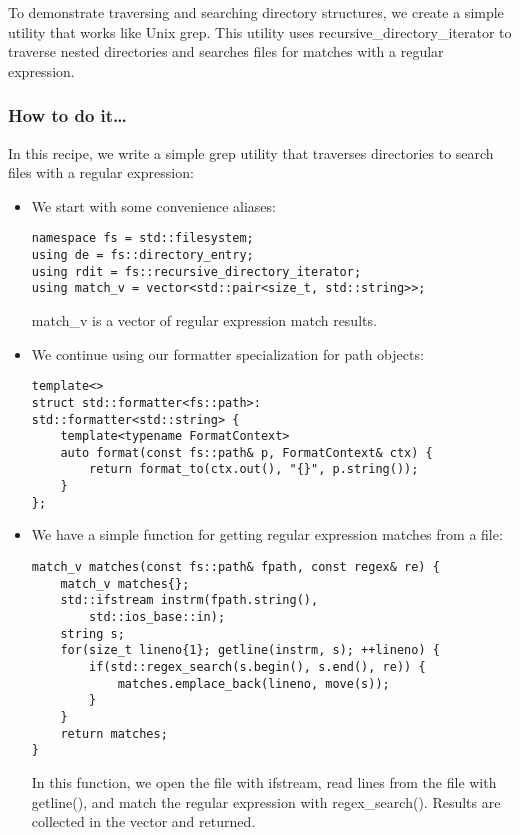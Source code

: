
To demonstrate traversing and searching directory structures, we create a simple utility that works like Unix grep. This utility uses recursive\_directory\_iterator to traverse nested directories and searches files for matches with a regular expression.

\subsubsection{How to do it…}

In this recipe, we write a simple grep utility that traverses directories to search files with a regular expression:

\begin{itemize}
\item 
We start with some convenience aliases:

\begin{lstlisting}[style=styleCXX]
namespace fs = std::filesystem;
using de = fs::directory_entry;
using rdit = fs::recursive_directory_iterator;
using match_v = vector<std::pair<size_t, std::string>>;
\end{lstlisting}

match\_v is a vector of regular expression match results.

\item 
We continue using our formatter specialization for path objects:

\begin{lstlisting}[style=styleCXX]
template<>
struct std::formatter<fs::path>:
std::formatter<std::string> {
	template<typename FormatContext>
	auto format(const fs::path& p, FormatContext& ctx) {
		return format_to(ctx.out(), "{}", p.string());
	}
};
\end{lstlisting}

\item 
We have a simple function for getting regular expression matches from a file:

\begin{lstlisting}[style=styleCXX]
match_v matches(const fs::path& fpath, const regex& re) {
	match_v matches{};
	std::ifstream instrm(fpath.string(),
		std::ios_base::in);
	string s;
	for(size_t lineno{1}; getline(instrm, s); ++lineno) {
		if(std::regex_search(s.begin(), s.end(), re)) {
			matches.emplace_back(lineno, move(s));
		}
	}
	return matches;
}
\end{lstlisting}

In this function, we open the file with ifstream, read lines from the file with getline(), and match the regular expression with regex\_search(). Results are collected in the vector and returned.


\end{itemize}
